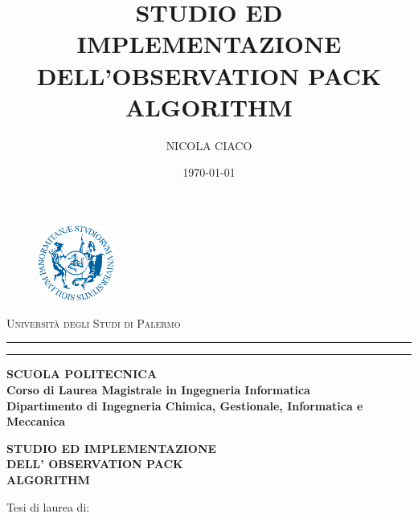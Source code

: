 \documentclass[12pt, oneside]{book}
\theoremstyle{definition}
\theoremstyle{plain}
\begin{document}
\pagestyle{empty}
\title{STUDIO ED IMPLEMENTAZIONE DELL'OBSERVATION PACK ALGORITHM}
\author{NICOLA CIACO}
\date{\today}

\begin{titlepage}
\begin{center}
\begin{figure}[!h]
  	\centering
 	\includegraphics[width=2.5cm]{./pictures/frontespizio/logo_unipa.png}
\end{figure}
{{\Large{\textsc{Università degli Studi di Palermo}}}} \\
\rule[0.1cm]{15.8cm}{0.1mm}
\rule[0.5cm]{15.8cm}{0.6mm}
{\small{\bf SCUOLA POLITECNICA\\
Corso di Laurea Magistrale in Ingegneria Informatica\\
Dipartimento di Ingegneria Chimica, Gestionale, Informatica e Meccanica}}\\
\vspace{10mm}
\vspace{2mm}
\end{center}
\vspace{12mm}
\begin{center}
{\LARGE{\bf STUDIO ED IMPLEMENTAZIONE}}\\
\vspace{3mm}
{\LARGE{\bf DELL' OBSERVATION PACK}}\\
 \vspace{3mm}
 {\LARGE{\bf ALGORITHM}}\\
\end{center}
\vspace{25mm}
\par
\noindent
\begin{minipage}[t]{0.70\textwidth}\raggedright
{\large Tesi di laurea di:\\
}
\end{minipage}
\end{titlepage}
\end{document}
